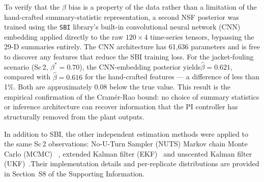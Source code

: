 \documentclass[aps,pre,twocolumn,superscriptaddress]{revtex4-2}
\begin{document}

To verify that the $\beta$ bias is a property of the data rather than a
limitation of the hand-crafted summary-statistic representation, a second
NSF posterior was trained using the \texttt{SBI} library's built-in
convolutional neural network (CNN) embedding applied directly to the raw
$120\times4$ time-series tensors, bypassing the 29-D summaries entirely.
The CNN architecture has 61{,}636 parameters and is free to discover any
features that reduce the SBI training loss.  For the jacket-fouling
scenario (Sc\,2, $\beta^* = 0.70$), the CNN-embedding posterior yields$\hat\beta = 0.621$, compared with $\hat\beta = 0.616$ for the hand-crafted
features --- a difference of less than 1\%.  Both are approximately $0.08$
below the true value.  This result is the empirical confirmation of the
Cramér-Rao bound: no choice of summary statistics or inference architecture
can recover information that the PI controller has structurally removed from the plant outputs.


In addition to SBI, the other independent estimation methods were applied to the same Sc\,2 observations:
No-U-Turn Sampler (NUTS) Markov chain Monte Carlo (MCMC) 
~\citep{Hoffman2014, galin_l__jones_610ba213},  
extended Kalman filter (EKF)~\citep{lee1994extended} and unscented Kalman
filter (UKF)~\citep{wan2000unscented}.Their implementation details and per-replicate distributions are provided in Section~S8 of the Supporting Information.
\end{document}
